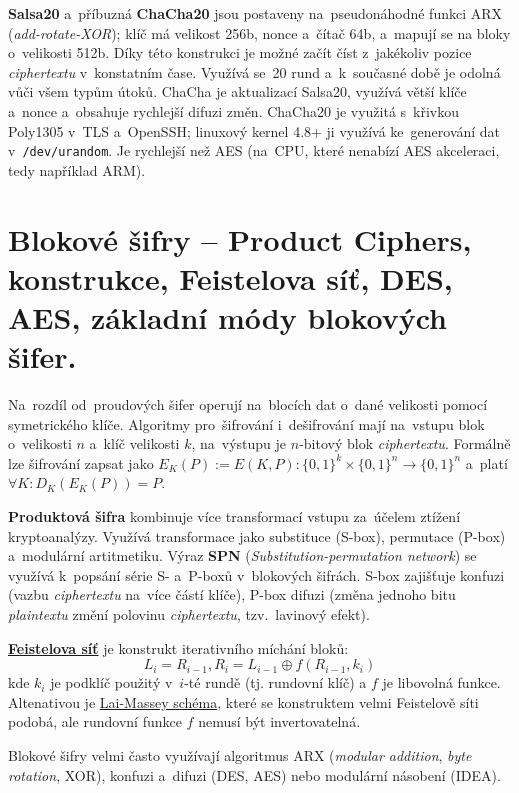 \textbf{Salsa20} a~příbuzná \textbf{ChaCha20} jsou postaveny na~pseudonáhodné funkci ARX (\emph{add-rotate-XOR}); klíč má velikost 256b, nonce a~čítač 64b, a~mapují se na bloky o~velikosti 512b. Díky této konstrukci je možné začít číst z~jakékoliv pozice \emph{ciphertextu} v~konstatním čase. Využívá se~20 rund a~k~současné době je odolná vůči všem typům útoků. ChaCha je aktualizací Salsa20, využívá větší klíče a~nonce a~obsahuje rychlejší difuzi změn. ChaCha20 je využitá s~křivkou Poly1305 v~TLS a~OpenSSH; linuxový kernel 4.8+ ji využívá ke~generování dat v~\texttt{/dev/urandom}. Je rychlejší než AES (na~CPU, které nenabízí AES akceleraci, tedy například ARM).

\clearpage
\section{Blokové šifry -- Product Ciphers, konstrukce, Feistelova síť, DES, AES, základní módy blokových šifer.}

Na~rozdíl od~proudových šifer operují na~blocích dat o~dané velikosti pomocí symetrického klíče. Algoritmy pro~šifrování i~dešifrování mají na~vstupu blok o~velikosti $n$ a~klíč velikosti $k$, na~výstupu je $n$-bitový blok \emph{ciphertextu}. Formálně lze šifrování zapsat jako $E_K (P) := E(K, P): \{0, 1\}^k \times \{0, 1\}^n \rightarrow \{0, 1\}^n$ a~platí $\forall K: D_K (E_K (P)) = P$.

\textbf{Produktová šifra} kombinuje více transformací vstupu za~účelem ztížení kryptoanalýzy. Využívá transformace jako substituce (S-box), permutace (P-box) a~modulární artitmetiku. Výraz \textbf{SPN} (\emph{Substitution-permutation network}) se využívá k~popsání série S- a~P-boxů v~blokových šifrách. S-box zajišťuje konfuzi (vazbu \emph{ciphertextu} na~více částí klíče), P-box difuzi (změna jednoho bitu \emph{plaintextu} změní polovinu \emph{ciphertextu}, tzv.~lavinový efekt).

\textbf{\href{https://en.wikipedia.org/wiki/Feistel_network}{Feistelova síť}} je konstrukt iterativního míchání bloků: $$L_i = R_{i-1}, R_i = L_{i-1} \oplus f(R_{i-1}, k_i)$$ kde $k_i$ je podklíč použitý v~$i$-té rundě (tj. rundovní klíč) a $f$ je libovolná funkce. Altenativou je \href{https://en.wikipedia.org/wiki/Lai-Massey_scheme}{Lai-Massey schéma}, které se konstruktem velmi Feistelově síti podobá, ale rundovní funkce $f$ nemusí být invertovatelná.

Blokové šifry velmi často využívají algoritmus ARX (\emph{modular addition}, \emph{byte rotation}, XOR), konfuzi a~difuzi (DES, AES) nebo modulární násobení (IDEA).

